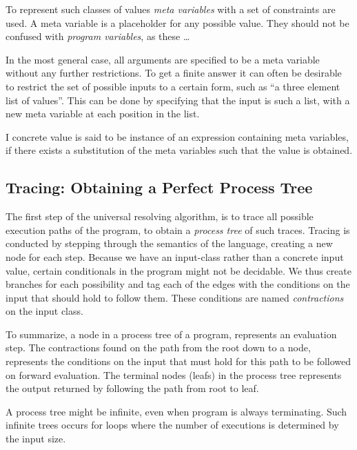\documentclass[10pt]{../sigplanconf}
\begin{document}
To represent such classes of values \textit{meta variables} with a set
of constraints are used. A meta variable is a placeholder for any
possible value. They should not be confused with \textit{program
  variables}, as these \ldots {}

In the most general case, all arguments are specified to be a meta
variable without any further restrictions. To get a finite answer it
can often be desirable to restrict the set of possible inputs to a
certain form, such as ``a three element list of values''. This can be
done by specifying that the input is such a list, with a new
meta variable at each position in the list.

I concrete value is said to be instance of an expression containing
meta variables, if there exists a substitution of the meta variables
such that the value is obtained. 

\subsection{Tracing: Obtaining a Perfect Process Tree}
The first step of the universal resolving algorithm, is to trace all
possible execution paths of the program, to obtain a \textit{process
  tree} of such traces. Tracing is conducted by stepping through the
semantics of the language, creating a new node for each step. Because
we have an input-class rather than a concrete input value, certain
conditionals in the program might not be decidable. We thus create
branches for each possibility and tag each of the edges with the
conditions on the input that should hold to follow them. These
conditions are named \textit{contractions} on the input class.

To summarize, a node in a process tree of a program, represents an
evaluation step. The contractions found on the path from the root down
to a node, represents the conditions on the input that must hold for
this path to be followed on forward evaluation. The terminal nodes
(leafs) in the process tree represents the output returned by
following the path from root to leaf.

A process tree might be infinite, even when program is always
terminating. Such infinite trees occurs for loops where the number of
executions is determined by the input size.
\end{document}
